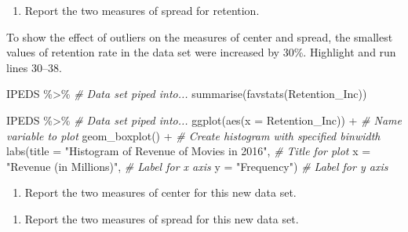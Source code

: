 \documentclass[
]{report}
\newenvironment{Shaded}{\begin{snugshade}}{\end{snugshade}}
\newcommand{\AttributeTok}[1]{\textcolor[rgb]{0.77,0.63,0.00}{#1}}
\newcommand{\CommentTok}[1]{\textcolor[rgb]{0.56,0.35,0.01}{\textit{#1}}}
\newcommand{\FunctionTok}[1]{\textcolor[rgb]{0.00,0.00,0.00}{#1}}
\newcommand{\NormalTok}[1]{#1}
\newcommand{\SpecialCharTok}[1]{\textcolor[rgb]{0.00,0.00,0.00}{#1}}
\newcommand{\StringTok}[1]{\textcolor[rgb]{0.31,0.60,0.02}{#1}}
\providecommand{\tightlist}{%
  \setlength{\itemsep}{0pt}\setlength{\parskip}{0pt}}
\begin{document}
\begin{enumerate}
\def\labelenumi{\arabic{enumi}.}
\setcounter{enumi}{9}
\tightlist
\item
  Report the two measures of spread for retention.
\end{enumerate}

\vspace{0.8in}

\newpage

To show the effect of outliers on the measures of center and spread, the smallest values of retention rate in the data set were increased by 30\%. Highlight and run lines 30--38.

\begin{Shaded}
\begin{Highlighting}[]
\NormalTok{IPEDS }\SpecialCharTok{\%\textgreater{}\%} \CommentTok{\# Data set piped into...}
  \FunctionTok{summarise}\NormalTok{(}\FunctionTok{favstats}\NormalTok{(Retention\_Inc))}
\end{Highlighting}
\end{Shaded}

\begin{Shaded}
\begin{Highlighting}[]
\NormalTok{IPEDS }\SpecialCharTok{\%\textgreater{}\%} \CommentTok{\# Data set piped into...}
  \FunctionTok{ggplot}\NormalTok{(}\FunctionTok{aes}\NormalTok{(}\AttributeTok{x =}\NormalTok{ Retention\_Inc)) }\SpecialCharTok{+}   \CommentTok{\# Name variable to plot}
  \FunctionTok{geom\_boxplot}\NormalTok{() }\SpecialCharTok{+}  \CommentTok{\# Create histogram with specified binwidth}
  \FunctionTok{labs}\NormalTok{(}\AttributeTok{title =} \StringTok{"Histogram of Revenue of Movies in 2016"}\NormalTok{, }\CommentTok{\# Title for plot}
       \AttributeTok{x =} \StringTok{"Revenue (in Millions)"}\NormalTok{, }\CommentTok{\# Label for x axis}
       \AttributeTok{y =} \StringTok{"Frequency"}\NormalTok{) }\CommentTok{\# Label for y axis}
\end{Highlighting}
\end{Shaded}

\begin{enumerate}
\def\labelenumi{\arabic{enumi}.}
\setcounter{enumi}{10}
\tightlist
\item
  Report the two measures of center for this new data set.
\end{enumerate}

\vspace{0.8in}

\begin{enumerate}
\def\labelenumi{\arabic{enumi}.}
\setcounter{enumi}{11}
\tightlist
\item
  Report the two measures of spread for this new data set.
\end{enumerate}
\end{document}
